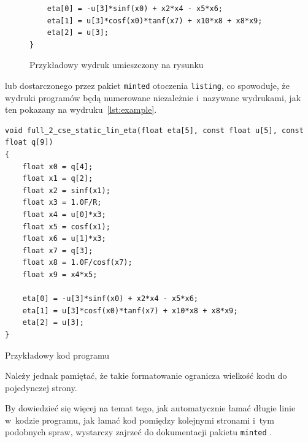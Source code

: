 {\begin{figure}[tp]
\begin{verbatim}
    eta[0] = -u[3]*sinf(x0) + x2*x4 - x5*x6;
    eta[1] = u[3]*cosf(x0)*tanf(x7) + x10*x8 + x8*x9;
    eta[2] = u[3];
}
    \end{verbatim}
  \renewcommand{\figurename}{\red Rysunek}%
  \caption[Przykładowy wydruk umieszczony na rysunku]{\red Przykładowy wydruk umieszczony na rysunku}
    \label{rys:wyd}
\end{figure}
lub dostarczonego przez pakiet \texttt{minted} otoczenia \texttt{listing}, co spowoduje, że wydruki programów będą numerowane niezależnie i~nazywane wydrukami, jak ten pokazany na wydruku~\ref{lst:example}.
\begin{listing}[tp]
    \begin{verbatim}
void full_2_cse_static_lin_eta(float eta[5], const float u[5], const float q[9])
{
    float x0 = q[4];
    float x1 = q[2];
    float x2 = sinf(x1);
    float x3 = 1.0F/R;
    float x4 = u[0]*x3;
    float x5 = cosf(x1);
    float x6 = u[1]*x3;
    float x7 = q[3];
    float x8 = 1.0F/cosf(x7);
    float x9 = x4*x5;

    eta[0] = -u[3]*sinf(x0) + x2*x4 - x5*x6;
    eta[1] = u[3]*cosf(x0)*tanf(x7) + x10*x8 + x8*x9;
    eta[2] = u[3];
}
    \end{verbatim}
\caption{\red Przykładowy kod programu}
\label{lst:example}
\end{listing}
Należy jednak pamiętać, że takie formatowanie ogranicza wielkość kodu do pojedynczej strony.

By dowiedzieć się więcej na temat tego, jak automatycznie łamać długie linie w~kodzie programu, jak łamać kod pomiędzy kolejnymi stronami i~tym podobnych spraw, wystarczy zajrzeć do dokumentacji pakietu \texttt{minted} \cite{minted}.}

